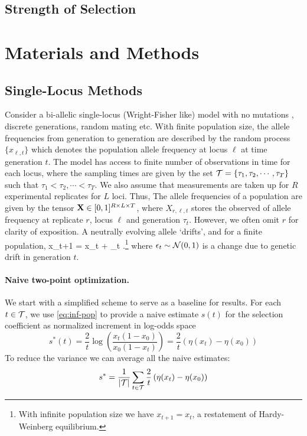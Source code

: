 \documentclass[11pt]{article}
\begin{document}
\subsection{Strength of  Selection}


\section{Materials and Methods}

\subsection{Single-Locus Methods}
Consider a bi-allelic single-locus (Wright-Fisher like) model with no
mutations \cite{Ewens2012Mathematical}, discrete generations, random
mating etc. With finite population size, the allele frequencies from
generation to generation are described by the random process
$\{x_{\ell,t}\}$ which denotes the population allele frequency at
locus $\ell$ at time generation $t$. The model has access to finite
number of observations in time for each locus, where the sampling
times are given by the set ${\cal T}=\{\tau_1,\tau_2,\cdots, \tau_T \}$
such that $\tau_1<\tau_2,\cdots<\tau_T$. We also assume that
measurements are taken up for $R$ experimental replicates for $L$
loci. Thus, The allele frequencies of a population are given by the
tensor ${\mathbf X} \in [0,1]^{R \times L \times T}$, where $X_{r,\ell,t}$
stores the observed of allele frequency at replicate $r$, locus $\ell$
and generation $\tau_t$. However, we often omit $r$ for clarity of
exposition. A neutrally evolving allele `drifts', and for a finite
population,
\beq x_{t+1} = x_t + \epsilon_t\; .\footnote{With infinite population size
	we have $x_{t+1} = x_t$, a restatement of Hardy-Weinberg
	equilibrium.}
\label{eq:drift}
\eeq where $\epsilon_t \sim {\cal N}(0,1)$ is a change due to genetic drift
in generation $t$.

\paragraph{Naive two-point optimization.} We start with a simplified
scheme to serve as a baseline for results.  For each $t\in {\cal T}$, we
use \eqref{eq:inf-pop} to provide a naive estimate $s(t)$ for the
selection coefficient as normalized increment in log-odds space
\begin{equation}
	s^*(t)=\frac{2}{t} \log \left( \frac{x_t(1-x_0)}{x_0 (1-x_t)} \right) = \frac{2}{t}  
	\left( \eta(x_t)-\eta(x_0)\right)
	\label{eq:naive2point}
\end{equation}
To reduce the variance we can average all the naive estimates: 
\begin{equation}
	s^*=\frac{1}{|{\cal T}|}\sum_{t\in {\cal T}}\frac{2}{t}  \left( \eta(x_t)-\eta(x_0)\right)
	\label{eq:naive}
\end{equation}
\end{document}

